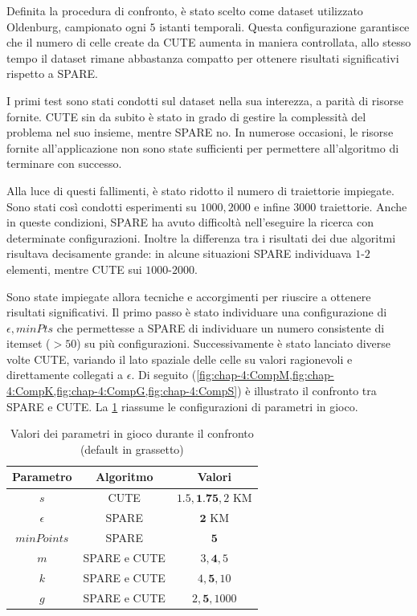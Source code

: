 Definita la procedura di confronto, è stato scelto come dataset utilizzato Oldenburg, campionato ogni \(5\) istanti temporali.
Questa configurazione garantisce che il numero di celle create da CUTE aumenta in maniera controllata, allo stesso tempo il dataset rimane abbastanza compatto per ottenere risultati significativi rispetto a SPARE.

I primi test sono stati condotti sul dataset nella sua interezza, a parità di risorse fornite.
CUTE sin da subito è stato in grado di gestire la complessità del problema nel suo insieme, mentre SPARE no.
In numerose occasioni, le risorse fornite all'applicazione non sono state sufficienti per permettere all'algoritmo di terminare con successo.

Alla luce di questi fallimenti, è stato ridotto il numero di traiettorie impiegate.
Sono stati così condotti esperimenti su \(1000, 2000\) e infine \(3000\) traiettorie.
Anche in queste condizioni, SPARE ha avuto difficoltà nell'eseguire la ricerca con determinate configurazioni.
Inoltre la differenza tra i risultati dei due algoritmi risultava decisamente grande: in alcune situazioni SPARE individuava \(1\text{-}2\) elementi, mentre CUTE sui \(1000\text{-}2000\).

Sono state impiegate allora tecniche e accorgimenti per riuscire a ottenere risultati significativi.
Il primo passo è stato individuare una configurazione di \(\epsilon, minPts\) che permettesse a SPARE di individuare un numero consistente di itemset (\(> 50\)) su più configurazioni.
Successivamente è stato lanciato diverse volte CUTE, variando il lato spaziale delle celle su valori ragionevoli e direttamente collegati a \(\epsilon\).
Di seguito (\cref{fig:chap-4:CompM,fig:chap-4:CompK,fig:chap-4:CompG,fig:chap-4:CompS}) è illustrato il confronto tra SPARE e CUTE.
La \cref{tab:comparison-variation} riassume le configurazioni di parametri in gioco.

\begin{table}[H]
    \centering
   \begin{tabular}{||c c c||}
 \hline
     Parametro & Algoritmo & Valori \\ [0.4ex] 
 \hline\hline
   \(s\) & CUTE & \(1.5,\textbf{1.75},2\) KM \\
 \hline
  \(\epsilon\) & SPARE & \(\textbf{2}\) KM \\
 \hline
 \(minPoints\) & SPARE & \(\textbf{5}\) \\
 \hline
 \(m\) & SPARE e CUTE & \(3,\textbf{4},5\) \\
 \hline
 \(k\) & SPARE e CUTE & \(4,\textbf{5},10\) \\
 \hline
 \(g\) & SPARE e CUTE & \(2,\textbf{5},1000\) \\
 \hline
\end{tabular}
    \caption{Valori dei parametri in gioco durante il confronto (default in grassetto)}
    \label{tab:comparison-variation}
\end{table}

